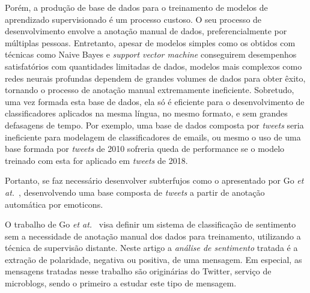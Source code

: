 

Porém, a produção de base de dados para o treinamento de modelos de aprendizado supervisionado é um processo custoso.
O seu processo de desenvolvimento envolve a anotação manual de dados, preferencialmente por múltiplas pessoas.
Entretanto, apesar de modelos simples como os obtidos com técnicas como Naive Bayes e \textit{support vector machine}
conseguirem desempenhos satisfatórios com quantidades limitadas de dados, modelos mais complexos como redes neurais
profundas dependem de grandes volumes de dados para obter êxito, tornando o processo de anotação manual extremamente
ineficiente.
Sobretudo, uma vez formada esta base de dados, ela só é eficiente para o desenvolvimento de classificadores aplicados
na mesma língua, no mesmo formato, e sem grandes defasagens de tempo.
Por exemplo, uma base de dados composta por \textit{tweets} seria ineficiente para modelagem de classificadores de
emails, ou mesmo o uso de uma base formada por \textit{tweets} de 2010 sofreria queda de performance se o modelo
treinado com esta for aplicado em \textit{tweets} de 2018.

Portanto, se faz necessário desenvolver subterfujos como o apresentado por Go \textit{et at.}~\cite{go09}, desenvolvendo
uma base composta de \textit{tweets} a partir de anotação automática por emoticons.

O trabalho de Go \textit{et at.}~\cite{go09} visa definir um sistema de classificação de sentimento sem a necessidade de
anotação manual dos dados para treinamento, utilizando a técnica de supervisão distante.
Neste artigo a \textit{análise de sentimento} tratada é a extração de polaridade, negativa ou positiva, de uma mensagem.
Em especial, as mensagens tratadas nesse trabalho são originárias do Twitter, serviço de microblogs, sendo o primeiro a
estudar este tipo de mensagem.

